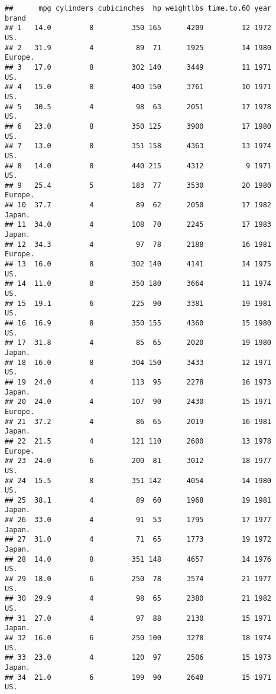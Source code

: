 \documentclass[11pt,]{article}
\begin{document}
\begin{verbatim}
##      mpg cylinders cubicinches  hp weightlbs time.to.60 year    brand
## 1   14.0         8         350 165      4209         12 1972      US.
## 2   31.9         4          89  71      1925         14 1980  Europe.
## 3   17.0         8         302 140      3449         11 1971      US.
## 4   15.0         8         400 150      3761         10 1971      US.
## 5   30.5         4          98  63      2051         17 1978      US.
## 6   23.0         8         350 125      3900         17 1980      US.
## 7   13.0         8         351 158      4363         13 1974      US.
## 8   14.0         8         440 215      4312          9 1971      US.
## 9   25.4         5         183  77      3530         20 1980  Europe.
## 10  37.7         4          89  62      2050         17 1982   Japan.
## 11  34.0         4         108  70      2245         17 1983   Japan.
## 12  34.3         4          97  78      2188         16 1981  Europe.
## 13  16.0         8         302 140      4141         14 1975      US.
## 14  11.0         8         350 180      3664         11 1974      US.
## 15  19.1         6         225  90      3381         19 1981      US.
## 16  16.9         8         350 155      4360         15 1980      US.
## 17  31.8         4          85  65      2020         19 1980   Japan.
## 18  16.0         8         304 150      3433         12 1971      US.
## 19  24.0         4         113  95      2278         16 1973   Japan.
## 20  24.0         4         107  90      2430         15 1971  Europe.
## 21  37.2         4          86  65      2019         16 1981   Japan.
## 22  21.5         4         121 110      2600         13 1978  Europe.
## 23  24.0         6         200  81      3012         18 1977      US.
## 24  15.5         8         351 142      4054         14 1980      US.
## 25  38.1         4          89  60      1968         19 1981   Japan.
## 26  33.0         4          91  53      1795         17 1977   Japan.
## 27  31.0         4          71  65      1773         19 1972   Japan.
## 28  14.0         8         351 148      4657         14 1976      US.
## 29  18.0         6         250  78      3574         21 1977      US.
## 30  29.9         4          98  65      2380         21 1982      US.
## 31  27.0         4          97  88      2130         15 1971   Japan.
## 32  16.0         6         250 100      3278         18 1974      US.
## 33  23.0         4         120  97      2506         15 1973   Japan.
## 34  21.0         6         199  90      2648         15 1971      US.

\end{verbatim}
\end{document}
